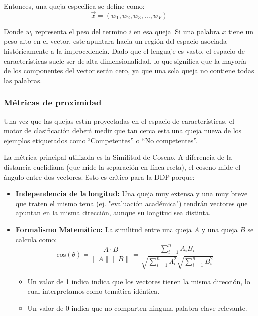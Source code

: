 Entonces, una queja especifica se define como:
\begin{equation}
\vec{x} = (w_1, w_2, w_3, \dots, w_V)
\end{equation}

Donde $w_i$ representa el peso del termino $i$ en esa queja. Si una palabra $x$ tiene un peso alto en el vector, este apuntara hacia un región del espacio asociada históricamente  a la improcedencia. Dado que el lenguaje es vasto, el espacio de características suele ser de alta dimensionalidad, lo que significa que la mayoría de los componentes del vector serán cero, ya que una sola queja no contiene todas las palabras.

\subsubsection{Métricas de proximidad}

Una vez que las quejas están proyectadas en el espacio de características, el motor de clasificación deberá medir que tan cerca esta una queja nueva de los ejemplos etiquetados como “Competentes” o “No competentes”.

La métrica principal utilizada es la Similitud de Coseno. A diferencia de la distancia euclidiana (que mide la separación en línea recta), el coseno mide el ángulo entre dos vectores. Esto es crítico para la DDP porque:

\begin{itemize}
    \item \textbf{Independencia de la longitud:} Una queja muy extensa y una muy breve que traten el mismo tema (ej. "evaluación académica") tendrán vectores que apuntan en la misma dirección, aunque su longitud sea distinta.
    \item \textbf{Formalismo Matemático:} La similitud entre una queja $A$ y una queja $B$ se calcula como:
    \begin{equation}
    \text{cos}(\theta) = \frac{A \cdot B}{\|A\| \|B\|} = \frac{\sum_{i=1}^{n} A_i B_i}{\sqrt{\sum_{i=1}^{n} A_i^2} \sqrt{\sum_{i=1}^{n} B_i^2}}
    \end{equation}
    \begin{itemize}
        \item Un valor de 1 indica indica que los vectores tienen la misma dirección, lo cual interpretamos como temática idéntica.
        \item Un valor de 0 indica que no comparten ninguna palabra clave relevante.
    \end{itemize}
\end{itemize}

